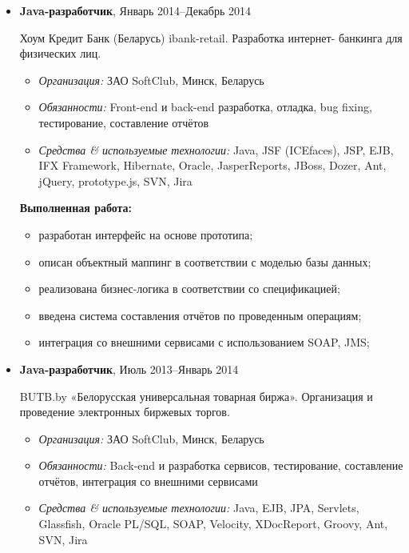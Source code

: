 \documentclass[a4paper, 12pt]{article}
\newcommand{\position}[1]{
    \textbf{#1}}
\newcommand{\itemlabel}[1]{
    \textit{#1:}}
\begin{document}
\begin{itemize}
        \item \position{Java-разработчик}, Январь 2014--Декабрь 2014

          Хоум Кредит Банк (Беларусь) ibank-retail. Разработка интернет- банкинга для физических лиц. 

            \begin{itemize}
                \item \itemlabel{Организация} ЗАО SoftClub, Минск, Беларусь
                \item \itemlabel{Обязанности} Front-end и back-end разработка, отладка, bug fixing, тестирование, составление отчётов
                \item \itemlabel{Средства \& используемые технологии} Java, JSF (ICEfaces), JSP, EJB, IFX Framework, Hibernate, Oracle, JasperReports, JBoss, Dozer, Ant, jQuery, prototype.js, SVN, Jira
            \end{itemize}
            
               \textbf{Выполненная работа:}
			\begin{itemize}
  				\item разработан интерфейс на основе прототипа;
  				\item описан объектный маппинг в соответствии с моделью базы данных;
  				\item реализована бизнес-логика в соответствии со спецификацией;
				\item введена система составления отчётов по проведенным операциям;
  				\item интеграция со внешними сервисами с использованием SOAP, JMS;
			\end{itemize}


        \item \position{Java-разработчик}, Июль 2013--Январь 2014

            BUTB.by «Белорусская универсальная товарная биржа». Организация и проведение электронных биржевых торгов.

            \begin{itemize}
                \item \itemlabel{Организация} ЗАО SoftClub, Минск, Беларусь
                \item \itemlabel{Обязанности} Back-end и разработка сервисов, тестирование, составление отчётов, интеграция со внешними сервисами
                \item \itemlabel{Средства \& используемые технологии} Java, EJB, JPA, Servlets, Glassfish, Oracle PL/SQL, SOAP, Velocity, XDocReport, Groovy, Ant, SVN, Jira
            \end{itemize}
            

\end{itemize}
\end{document}

